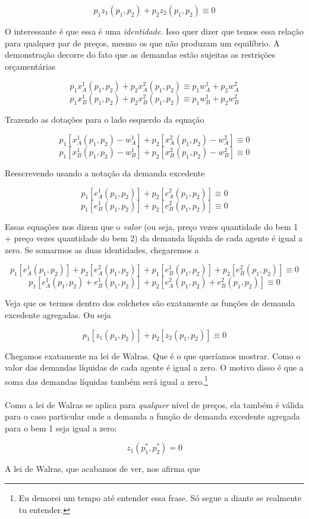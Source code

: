 \documentclass[a4paper,11pt,oneside]{book}
\theoremstyle{definition}
\theoremstyle{break}
\begin{document}
$$p_1 z_1(p_1,p_2) + p_2 z_2(p_1,p_2) \equiv 0$$

O interessante é que essa é uma \textit{identidade}. Isso quer dizer que temos essa relação para qualquer par de preços, mesmo os que não produzam um equilíbrio. A demonstração decorre do fato que as demandas estão sujeitas as restrições orçamentárias

$$p_1x_A^1(p_1,p_2) + p_2x_A^2(p_1,p_2) \equiv p_1w_A^1 + p_2w_A^2$$
$$p_1x_B^1(p_1,p_2) + p_2x_B^2(p_1,p_2) \equiv p_1w_B^1 + p_2w_B^2$$

Trazendo as dotações para o lado esquerdo da equação

$$p_1[x_A^1(p_1,p_2) - w_A^1] + p_2[x_A^2(p_1,p_2) - w_A^2] \equiv 0$$
$$p_1[x_B^1(p_1,p_2) - w_B^1] + p_2[x_B^2(p_1,p_2) - w_B^2] \equiv 0$$

Reescrevendo usando a notação da demanda excedente

$$p_1[e_A^1(p_1,p_2)] + p_2[e_A^2(p_1,p_2)] \equiv 0$$
$$p_1[e_B^1(p_1,p_2)] + p_2[e_B^2(p_1,p_2)] \equiv 0$$

Essas equações nos dizem que o \textit{valor} (ou seja, preço vezes quantidade do bem 1 + preço vezes quantidade do bem 2) da demanda líquida de cada agente é igual a zero. Se somarmos as duas identidades, chegaremos a

$$p_1[e_A^1(p_1,p_2)] + p_2[e_A^2(p_1,p_2)] + 
p_1[e_B^1(p_1,p_2)] + p_2[e_B^2(p_1,p_2)] \equiv 0$$
$$p_1[e_A^1(p_1,p_2) + e_B^1(p_1,p_2)] + p_2[e_A^2(p_1,p_2) + e_B^2(p_1,p_2)] \equiv 0$$

Veja que os termos dentro dos colchetes são exatamente as funções de demanda excedente agregadas. Ou seja

$$p_1[z_1(p_1,p_2)] + p_2[z_2(p_1,p_2) ] \equiv 0$$

Chegamos exatamente na lei de Walras. Que é o que queríamos mostrar. Como o valor das demandas líquidas de cada agente é igual a zero. O motivo disso é que a soma das demandas líquidas também será igual a zero.\footnote{Eu demorei um tempo até entender essa frase. Só segue a diante se realmente tu entender.}
\\
\\
Como a lei de Walras se aplica para \textit{qualquer} nível de preços, ela também é válida para o caso particular onde a demanda a função de demanda excedente agregada para o bem 1 seja igual a zero:

$$z_1(p_1^*,p_2^*) = 0$$

A lei de Walras, que acabamos de ver, nos afirma que
\end{document}
